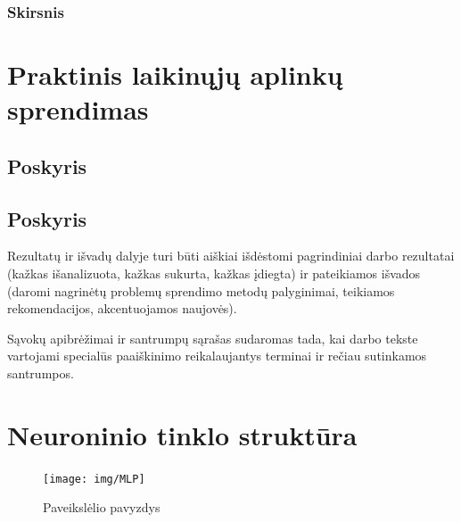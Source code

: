 \documentclass{VUMIFPSkursinis}
\begin{document}
\subsubsection{Skirsnis}


\section{Praktinis laikinųjų aplinkų sprendimas}
\subsection{Poskyris}
\subsection{Poskyris}

Rezultatų ir išvadų dalyje turi būti aiškiai išdėstomi pagrindiniai darbo
rezultatai (kažkas išanalizuota, kažkas sukurta, kažkas įdiegta) ir pateikiamos
išvados (daromi nagrinėtų problemų sprendimo metodų palyginimai, teikiamos
rekomendacijos, akcentuojamos naujovės).

\printbibliography[heading=bibintoc,category=cited] %

Sąvokų apibrėžimai ir santrumpų sąrašas sudaromas tada, kai darbo tekste
vartojami specialūs paaiškinimo reikalaujantys terminai ir rečiau sutinkamos
santrumpos.

\appendix  %

\section{Neuroninio tinklo struktūra}
\begin{figure}[H]
    \centering
    \texttt{[image: img/MLP]}
    \caption{Paveikslėlio pavyzdys}
    \label{img:mlp}
\end{figure}
\end{document}
